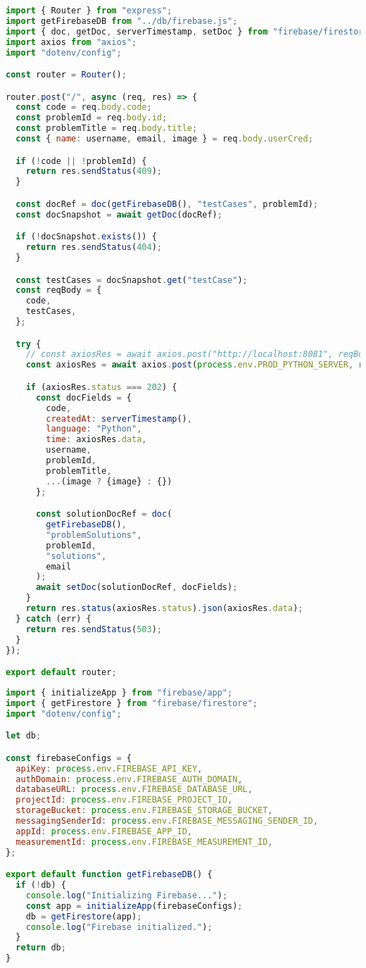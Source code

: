\begin{lstlisting}[language=JavaScript, frame=single, caption={Python хэлний middleware}]
import { Router } from "express";
import getFirebaseDB from "../db/firebase.js";
import { doc, getDoc, serverTimestamp, setDoc } from "firebase/firestore";
import axios from "axios";
import "dotenv/config";

const router = Router();

router.post("/", async (req, res) => {
  const code = req.body.code;
  const problemId = req.body.id;
  const problemTitle = req.body.title;
  const { name: username, email, image } = req.body.userCred;

  if (!code || !problemId) {
    return res.sendStatus(409);
  }

  const docRef = doc(getFirebaseDB(), "testCases", problemId);
  const docSnapshot = await getDoc(docRef);

  if (!docSnapshot.exists()) {
    return res.sendStatus(404);
  }

  const testCases = docSnapshot.get("testCase");
  const reqBody = {
    code,
    testCases,
  };

  try {
    // const axiosRes = await axios.post("http://localhost:8081", reqBody);
    const axiosRes = await axios.post(process.env.PROD_PYTHON_SERVER, reqBody);

    if (axiosRes.status === 202) {
      const docFields = {
        code,
        createdAt: serverTimestamp(),
        language: "Python",
        time: axiosRes.data,
        username,
        problemId,
        problemTitle,
        ...(image ? {image} : {})
      };

      const solutionDocRef = doc(
        getFirebaseDB(),
        "problemSolutions",
        problemId,
        "solutions",
        email
      );
      await setDoc(solutionDocRef, docFields);
    }
    return res.status(axiosRes.status).json(axiosRes.data);
  } catch (err) {
    return res.sendStatus(503);
  }
});

export default router;

\end{lstlisting}

\begin{lstlisting}[language=JavaScript, frame=single, caption={Stateless байдлаар firebase admin SDK ашиглалт}]
import { initializeApp } from "firebase/app";
import { getFirestore } from "firebase/firestore";
import "dotenv/config";

let db;

const firebaseConfigs = {
  apiKey: process.env.FIREBASE_API_KEY,
  authDomain: process.env.FIREBASE_AUTH_DOMAIN,
  databaseURL: process.env.FIREBASE_DATABASE_URL,
  projectId: process.env.FIREBASE_PROJECT_ID,
  storageBucket: process.env.FIREBASE_STORAGE_BUCKET,
  messagingSenderId: process.env.FIREBASE_MESSAGING_SENDER_ID,
  appId: process.env.FIREBASE_APP_ID,
  measurementId: process.env.FIREBASE_MEASUREMENT_ID,
};

export default function getFirebaseDB() {
  if (!db) {
    console.log("Initializing Firebase...");
    const app = initializeApp(firebaseConfigs);
    db = getFirestore(app);
    console.log("Firebase initialized.");
  }
  return db;
}
\end{lstlisting}

